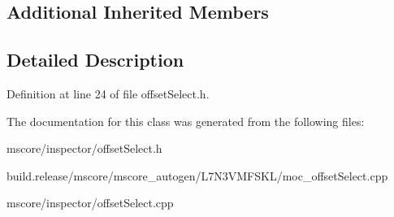\subsection*{Additional Inherited Members}


\subsection{Detailed Description}


Definition at line 24 of file offset\+Select.\+h.



The documentation for this class was generated from the following files\+:\begin{DoxyCompactItemize}
\item 
mscore/inspector/offset\+Select.\+h\item 
build.\+release/mscore/mscore\+\_\+autogen/\+L7\+N3\+V\+M\+F\+S\+K\+L/moc\+\_\+offset\+Select.\+cpp\item 
mscore/inspector/offset\+Select.\+cpp\end{DoxyCompactItemize}

